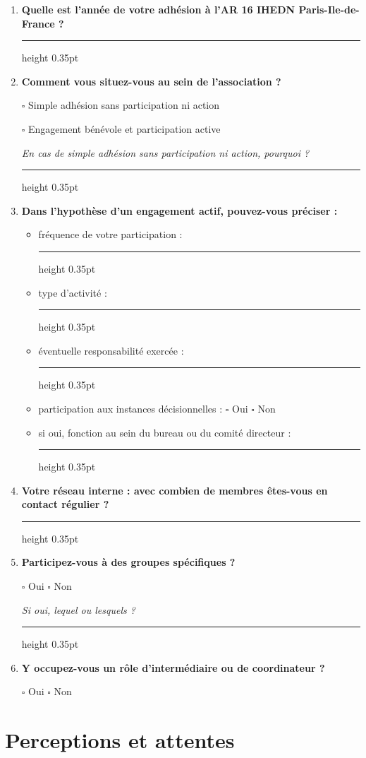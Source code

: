 \documentclass[12pt,a4paper]{article}
\newcommand{\Case}{\(\square\)}
\newcommand{\Ligne}{\leavevmode\leaders\hrule height 0.35pt\hfill\kern0pt}
\newcommand{\Question}[1]{\item \textbf{#1}\par\vspace{0.1em}}
\newcommand{\Consigne}[1]{\par{\small\itshape #1}\par}
\begin{document}
\begin{enumerate}[label=\textbf{\arabic*.},leftmargin=0pt,itemindent=1.9em,labelwidth=1.4em,labelsep=0.5em,resume]

\Question{Quelle est l'année de votre adhésion à l'AR 16 IHEDN Paris-Ile-de-France ?}

\Ligne

\Question{Comment vous situez-vous au sein de l'association ?}

\Case{} Simple adhésion sans participation ni action

\Case{} Engagement bénévole et participation active

\Consigne{En cas de simple adhésion sans participation ni action, pourquoi ?}

\Ligne

\Question{Dans l'hypothèse d'un engagement actif, pouvez-vous préciser :}

\begin{itemize}[leftmargin=1.5cm]
    \item fréquence de votre participation : \Ligne
    \item type d'activité : \Ligne
    \item éventuelle responsabilité exercée : \Ligne
    \item participation aux instances décisionnelles : \Case{} Oui \hspace{1cm} \Case{} Non
    \item si oui, fonction au sein du bureau ou du comité directeur : \Ligne
\end{itemize}

\Question{Votre réseau interne : avec combien de membres êtes-vous en contact régulier ?}

\Ligne

\Question{Participez-vous à des groupes spécifiques ?}

\Case{} Oui \hspace{1cm} \Case{} Non

\Consigne{Si oui, lequel ou lesquels ?}

\Ligne

\Question{Y occupez-vous un rôle d'intermédiaire ou de coordinateur ?}

\Case{} Oui \hspace{1cm} \Case{} Non

\end{enumerate}

\section{Perceptions et attentes}
\end{document}
